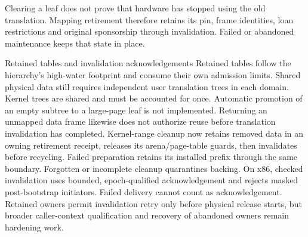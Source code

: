 Clearing a leaf does not prove that hardware has stopped using the old
translation. Mapping retirement therefore retains its pin, frame identities,
loan restrictions and original sponsorship through invalidation. Failed or
abandoned maintenance keeps that state in place.

\begin{implementationdetail}{Retained tables and invalidation acknowledgements}
Retained tables follow the hierarchy's high-water footprint and consume their
own admission limits. Shared physical data still requires independent
user translation trees in each domain. Kernel trees are shared and must be
accounted for once. Automatic promotion of an empty subtree to a large-page
leaf is not implemented. Returning an unmapped data frame likewise does not
authorize reuse before translation invalidation has completed. Kernel-range
cleanup now retains removed data in an owning retirement receipt, releases its
arena/page-table guards, then invalidates before recycling. Failed preparation
retains its installed prefix through the same boundary. Forgotten or incomplete
cleanup quarantines backing. On x86, checked invalidation uses bounded,
epoch-qualified acknowledgement and rejects masked post-bootstrap initiators.
Failed delivery cannot count as acknowledgement. Retained owners permit
invalidation retry only before physical release starts, but broader caller-context
qualification and recovery of abandoned owners remain hardening work.
\end{implementationdetail}

